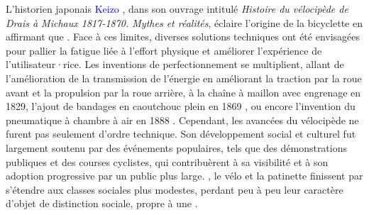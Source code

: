 \begin{refsegment}
{    L'historien japonais \textcolor{blue}{Keizo} \textcolor{blue}{\textcite[149]{kobayashi_histoire_1993}}, dans son ouvrage intitulé \textsl{Histoire du vélocipède de Drais à Michaux 1817-1870. Mythes et réalités}, éclaire l'origine de la bicyclette en affirmant que . Face à ces limites, diverses solutions techniques ont été envisagées pour pallier la fatigue liée à l’effort physique et améliorer l’expérience de l’utilisateur·rice. Les inventions de perfectionnement se multiplient, allant de l'amélioration de la transmission de l'énergie en améliorant la traction par la roue avant et la propulsion par la roue arrière, à la chaîne à maillon avec engrenage en 1829, l'ajout de bandages en caoutchouc plein en 1869 \textcolor{blue}{\autocites{inpi_draisienne_2020}[38]{jouenne_quest-ce_2022}}, ou encore l'invention du pneumatique à chambre à air en 1888 \textcolor{blue}{\autocite[14]{papon_retour_2012}}. Cependant, les avancées du vélocipède ne furent pas seulement d’ordre technique. Son développement social et culturel fut largement soutenu par des événements populaires, tels que des démonstrations publiques et des courses cyclistes, qui contribuèrent à sa visibilité et à son adoption progressive par un public plus large.
}, le vélo et la patinette finissent par s’étendre aux classes sociales plus modestes, perdant peu à peu leur caractère d'objet de distinction sociale, propre à une .%


\end{refsegment}
